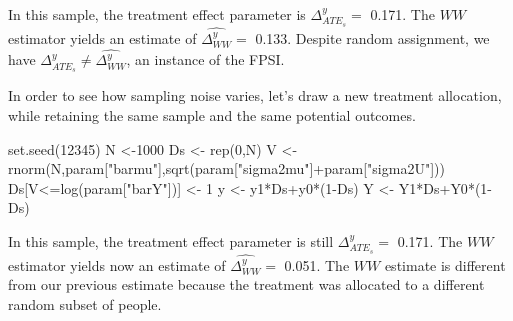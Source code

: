 \documentclass[
]{book}
\newenvironment{Shaded}{\begin{snugshade}}{\end{snugshade}}
\newcommand{\DecValTok}[1]{\textcolor[rgb]{0.00,0.00,0.81}{#1}}
\newcommand{\FunctionTok}[1]{\textcolor[rgb]{0.00,0.00,0.00}{#1}}
\newcommand{\NormalTok}[1]{#1}
\newcommand{\OtherTok}[1]{\textcolor[rgb]{0.56,0.35,0.01}{#1}}
\newcommand{\SpecialCharTok}[1]{\textcolor[rgb]{0.00,0.00,0.00}{#1}}
\newcommand{\StringTok}[1]{\textcolor[rgb]{0.31,0.60,0.02}{#1}}
\theoremstyle{definition}
\theoremstyle{definition}
\theoremstyle{definition}
\theoremstyle{definition}
\theoremstyle{remark}
\begin{document}
In this sample, the treatment effect parameter is \(\Delta^y_{ATE_s}=\) 0.171.
The \(WW\) estimator yields an estimate of \(\hat{\Delta^y_{WW}}=\) 0.133.
Despite random assignment, we have \(\Delta^y_{ATE_s}\neq\hat{\Delta^y_{WW}}\), an instance of the FPSI.

In order to see how sampling noise varies, let's draw a new treatment allocation, while retaining the same sample and the same potential outcomes.

\begin{Shaded}
\begin{Highlighting}[]
\FunctionTok{set.seed}\NormalTok{(}\DecValTok{12345}\NormalTok{)}
\NormalTok{N }\OtherTok{\textless{}{-}}\DecValTok{1000}
\NormalTok{Ds }\OtherTok{\textless{}{-}} \FunctionTok{rep}\NormalTok{(}\DecValTok{0}\NormalTok{,N)}
\NormalTok{V }\OtherTok{\textless{}{-}} \FunctionTok{rnorm}\NormalTok{(N,param[}\StringTok{"barmu"}\NormalTok{],}\FunctionTok{sqrt}\NormalTok{(param[}\StringTok{"sigma2mu"}\NormalTok{]}\SpecialCharTok{+}\NormalTok{param[}\StringTok{"sigma2U"}\NormalTok{]))}
\NormalTok{Ds[V}\SpecialCharTok{\textless{}=}\FunctionTok{log}\NormalTok{(param[}\StringTok{"barY"}\NormalTok{])] }\OtherTok{\textless{}{-}} \DecValTok{1} 
\NormalTok{y }\OtherTok{\textless{}{-}}\NormalTok{ y1}\SpecialCharTok{*}\NormalTok{Ds}\SpecialCharTok{+}\NormalTok{y0}\SpecialCharTok{*}\NormalTok{(}\DecValTok{1}\SpecialCharTok{{-}}\NormalTok{Ds)}
\NormalTok{Y }\OtherTok{\textless{}{-}}\NormalTok{ Y1}\SpecialCharTok{*}\NormalTok{Ds}\SpecialCharTok{+}\NormalTok{Y0}\SpecialCharTok{*}\NormalTok{(}\DecValTok{1}\SpecialCharTok{{-}}\NormalTok{Ds)}
\end{Highlighting}
\end{Shaded}

In this sample, the treatment effect parameter is still \(\Delta^y_{ATE_s}=\) 0.171.
The \(WW\) estimator yields now an estimate of \(\hat{\Delta^y_{WW}}=\) 0.051.
The \(WW\) estimate is different from our previous estimate because the treatment was allocated to a different random subset of people.
\end{document}
